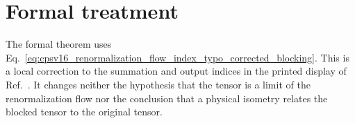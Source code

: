 \documentclass{article}
\begin{document}
\section{Formal treatment}

The formal theorem uses
Eq.~\ref{eq:cpsv16_renormalization_flow_index_typo_corrected_blocking}. This is
a local correction to the summation and output indices in the printed display
of Ref.~\cite{Cirac2016MPDO_arXiv}. It changes neither the hypothesis that the
tensor is a limit of the renormalization flow nor the conclusion that a
physical isometry relates the blocked tensor to the original tensor.



\end{document}
